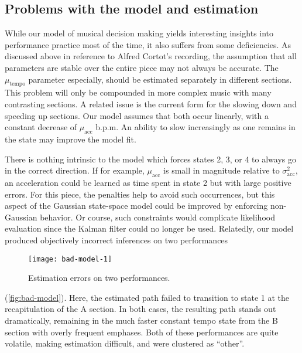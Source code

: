 \documentclass[12pt]{article}
\begin{document}
\subsection{Problems with the model and estimation}
\label{sec:problems-with-model}

While our model of musical decision making yields interesting insights
into performance practice most of the time, it also suffers from some
deficiencies. As discussed above in reference to Alfred Cortot's
recording, the assumption that all parameters are stable over the
entire piece may not always be accurate. The $\mu_{\textrm{tempo}}$
parameter especially, should be estimated separately in different
sections. This problem will only be compounded in more complex music
with many contrasting sections. A related issue is the current form
for the slowing down and speeding up sections. Our model assumes that
both occur linearly, with a constant decrease of $\mu_{\textrm{acc}}$
b.p.m. An ability to slow increasingly as one remains in the state may
improve the model fit.

There is nothing intrinsic to the model which forces states 2,
3, or 4 to always go in the correct direction. If for example,
$\mu_{\textrm{acc}}$ is small in magnitude relative to
$\sigma^2_{\textrm{acc}}$, an acceleration could be learned as time
spent in state 2 but with large positive errors. For this piece, the
penalties help to avoid such occurrences, but this aspect of the
Gaussian state-space model could be improved by enforcing non-Gaussian
behavior. Or course, such constraints would complicate likelihood
evaluation since the Kalman filter could no longer be used. Relatedly,
our model produced objectively incorrect inferences on two performances
\begin{figure}[t]
  \centering
  \texttt{[image: bad-model-1]}
  \caption{Estimation errors on two performances.}
  \label{fig:bad-model}
\end{figure}
(\autoref{fig:bad-model}). Here, the estimated
path failed to transition to state 1 at the
recapitulation of the A section. In both cases, the resulting path
stands out dramatically, remaining in the much faster constant tempo
state from the B section with overly frequent emphases. Both of these
performances are quite volatile, making estimation difficult, and were clustered as ``other''. 

\end{document}
